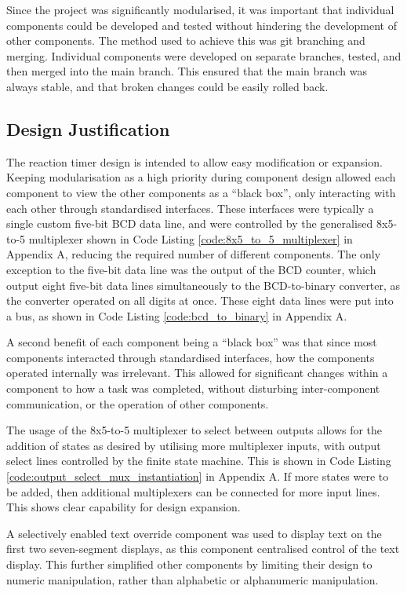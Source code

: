 \documentclass[11pt]{article}
\begin{document}
Since the project was significantly modularised, it was important that individual components could be developed and tested without hindering the development of other components. The method used to achieve this was git branching and merging. Individual components were developed on separate branches, tested, and then merged into the main branch. This ensured that the main branch was always stable, and that broken changes could be easily rolled back.

\subsection{Design Justification}

The reaction timer design is intended to allow easy modification or expansion. Keeping modularisation as a high priority during component design allowed each component to view the other components as a ``black box'', only interacting with each other through standardised interfaces. These interfaces were typically a single custom five-bit BCD data line, and were controlled by the generalised 8x5-to-5 multiplexer shown in Code Listing \ref{code:8x5_to_5_multiplexer} in Appendix A, reducing the required number of different components. The only exception to the five-bit data line was the output of the BCD counter, which output eight five-bit data lines simultaneously to the BCD-to-binary converter, as the converter operated on all digits at once. These eight data lines were put into a bus, as shown in Code Listing \ref{code:bcd_to_binary} in Appendix A.

A second benefit of each component being a ``black box'' was that since most components interacted through standardised interfaces, how the components operated internally was irrelevant. This allowed for significant changes within a component to how a task was completed, without disturbing inter-component communication, or the operation of other components.

The usage of the 8x5-to-5 multiplexer to select between outputs allows for the addition of states as desired by utilising more multiplexer inputs, with output select lines controlled by the finite state machine. This is shown in Code Listing \ref{code:output_select_mux_instantiation} in Appendix A. If more states were to be added, then additional multiplexers can be connected for more input lines. This shows clear capability for design expansion.

A selectively enabled text override component was used to display text on the first two seven-segment displays, as this component centralised control of the text display. This further simplified other components by limiting their design to numeric manipulation, rather than alphabetic or alphanumeric manipulation.
\end{document}
